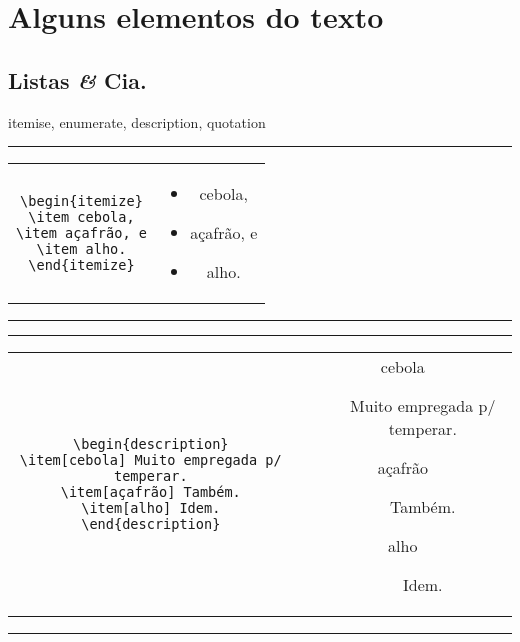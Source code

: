 \section{Alguns elementos do texto}

\subsection[Listas]{Listas {\it \&} Cia.}

itemise, enumerate, description, quotation

\begin{center}\footnotesize\hrule\smallskip
\begin{tabular}{c|c}
\begin{minipage}{.465\textwidth}
\begin{verbatim}
\begin{itemize}
\item cebola,
\item açafrão, e
\item alho.
\end{itemize}
\end{verbatim}
\end{minipage} &
\begin{minipage}{.465\textwidth}
\begin{itemize}
\item cebola,
\item açafrão, e
\item alho.
\end{itemize}
\end{minipage}
\end{tabular}
\smallskip\hrule
\end{center}


\begin{center}\footnotesize\hrule\smallskip
\begin{tabular}{c|c}
\begin{minipage}{.465\textwidth}
\begin{verbatim}
\begin{description}
\item[cebola] Muito empregada p/ temperar.
\item[açafrão] Também.
\item[alho] Idem.
\end{description}
\end{verbatim}
\end{minipage} &
\begin{minipage}{.465\textwidth}
\begin{description}
\item[cebola] Muito empregada p/ temperar.
\item[açafrão] Também.
\item[alho] Idem.
\end{description}
\end{minipage}
\end{tabular}
\smallskip\hrule
\end{center}
